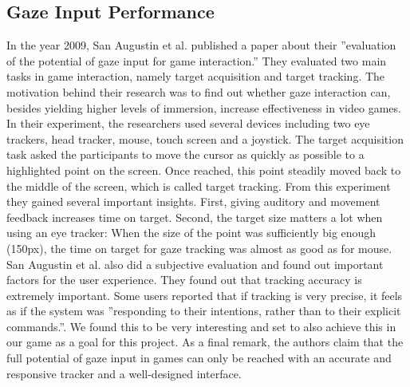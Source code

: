 \documentclass{sigchi}
\begin{document}
\subsection{Gaze Input Performance}
In the year 2009, San Augustin et al. published a paper about their ''evaluation of the potential of gaze input for game interaction.'' \cite{san2009evaluation} They evaluated two main tasks in game interaction, namely target acquisition and target tracking. The motivation behind their research was to find out whether gaze interaction can, besides yielding higher levels of immersion, increase effectiveness in video games. In their experiment, the researchers used several devices including two eye trackers, head tracker, mouse, touch screen and a joystick. The target acquisition task asked the participants to move the cursor as quickly as possible to a highlighted point on the screen. Once reached, this point steadily moved back to the middle of the screen, which is called target tracking. From this experiment they gained several important insights. First, giving auditory and movement feedback increases time on target. Second, the target size matters a lot when using an eye tracker: When the size of the point was sufficiently big enough (150px), the time on target for gaze tracking was almost as good as for mouse.\\
San Augustin et al. also did a subjective evaluation and found out important factors for the user experience. They found out that tracking accuracy is extremely important. Some users reported that if tracking is very precise, it feels as if the system was ''responding to their intentions, rather than to their explicit commands.''\cite{san2009evaluation}. We found this to be very interesting and set to also achieve this in our game as a goal for this project. As a final remark, the authors claim that the full potential of gaze input in games can only be reached with an accurate and responsive tracker and a well-designed interface.
\end{document}
